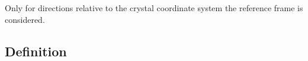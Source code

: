\documentclass[compress]{beamer}
\begin{document}
\begin{frame}[fragile]
\begin{overlayarea}{\textwidth}{8cm}
\begin{columns}
\begin{column}{8cm}
    \end{column}
    \begin{column}{3.5cm}
    \end{column}
  \end{columns}

  \pause
  \medskip

  Only for directions relative to the crystal coordinate system the reference
  frame is considered.

\end{overlayarea}
\end{frame}

\subsection*{Definition}
\end{document}
